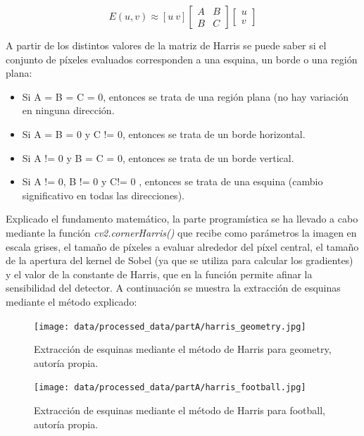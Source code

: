 \documentclass[a4paper,12pt]{article}
\begin{document}
{\vspace{0.5cm}

\begin{equation}
    E(u, v) \approx [u \ v] \begin{bmatrix} A & B \\ B & C \end{bmatrix} \begin{bmatrix} u \\ v \end{bmatrix}
\end{equation}

\vspace{0.5cm}

A partir de los distintos valores de la matriz de Harris se puede saber si el conjunto de píxeles evaluados corresponden a una esquina, un borde o una región plana:

\vspace{0.5cm}

\begin{itemize}
    \item Si A = B = C = 0, entonces se trata de una región plana (no hay variación en ninguna dirección.
    \item Si A = B = 0 y C != 0, entonces se trata de un borde horizontal.
    \item Si A != 0 y B = C = 0, entonces se trata de un borde vertical.
    \item Si A != 0, B != 0 y C!= 0 , entonces se trata de una esquina (cambio significativo en todas las direcciones).
\end{itemize}

\vspace{0.5cm}

Explicado el fundamento matemático, la parte programística se ha llevado a cabo mediante la función \textit{cv2.cornerHarris()}
que recibe como parámetros la imagen en escala grises, el tamaño de píxeles a evaluar alrededor del píxel central, 
el tamaño de la apertura del kernel de Sobel (ya que se utiliza para calcular los gradientes) y el valor de la constante de Harris, que 
en la función permite afinar la sensibilidad del detector. A continuación se muestra la extracción de esquinas mediante el método explicado:

\vspace{0.5cm}

\begin{figure}[h!]
    \centering
    \begin{minipage}[b]{0.35\textwidth}
        \centering
        \texttt{[image: data/processed\_data/partA/harris\_geometry.jpg]}
        \caption{Extracción de esquinas mediante el método de Harris para geometry, autoría propia.}
        \label{fig:harris-geometry}
    \end{minipage}
    \hfill
    \begin{minipage}[b]{0.45\textwidth}
        \centering
        \texttt{[image: data/processed\_data/partA/harris\_football.jpg]}
        \caption{Extracción de esquinas mediante el método de Harris para football, autoría propia.}
        \label{fig:harris-football}
    \end{minipage}


\end{figure}}
\end{document}
